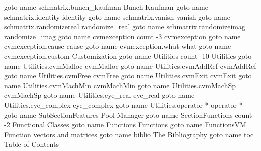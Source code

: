 \documentclass[12pt,letterpaper]{article}
\begin{document}
        \pdfoutline goto name {schmatrix.bunch_kaufman}                       {Bunch-Kaufman}
        \pdfoutline goto name {schmatrix.identity}                            {identity}
        \pdfoutline goto name {schmatrix.vanish}                              {vanish}
        \pdfoutline goto name {schmatrix.randomizereal}                       {randomize_real}
        \pdfoutline goto name {schmatrix.randomizeimag}                       {randomize_imag}
    \pdfoutline goto name {cvmexception} count -3 {cvmexception}
        \pdfoutline goto name {cvmexception.cause}          {cause}
        \pdfoutline goto name {cvmexception.what}           {what}
        \pdfoutline goto name {cvmexception.custom}         {Customization}
    \pdfoutline goto name {Utilities} count -10 {Utilities}
        \pdfoutline goto name {Utilities.cvmMalloc}         {cvmMalloc}
        \pdfoutline goto name {Utilities.cvmAddRef}         {cvmAddRef}
        \pdfoutline goto name {Utilities.cvmFree}           {cvmFree}
        \pdfoutline goto name {Utilities.cvmExit}           {cvmExit}
        \pdfoutline goto name {Utilities.cvmMachMin}        {cvmMachMin}
        \pdfoutline goto name {Utilities.cvmMachSp}         {cvmMachSp}
        \pdfoutline goto name {Utilities.eye_real}          {eye_real}
        \pdfoutline goto name {Utilities.eye_complex}       {eye_complex}
        \pdfoutline goto name {Utilities.operator *}        {operator *}
        \pdfoutline goto name {SubSectionFeatures}        {Pool Manager}
\pdfoutline goto name {SectionFunctions} count -2 {Functional Classes}
    \pdfoutline goto name {Functions} {Functions}
    \pdfoutline goto name {FunctionsVM} {Function vectors and matrices}
\pdfoutline goto name {biblio} {The Bibliography}
\pdfoutline goto name {toc} {Table of Contents}
\end{document}
